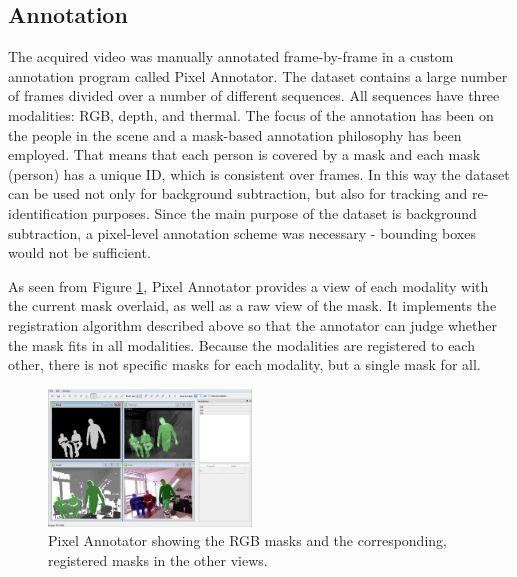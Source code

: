 \documentclass[10pt,twocolumn,letterpaper]{article}
\begin{document}
\subsection{Annotation}
%
The acquired video was manually annotated frame-by-frame in a custom annotation program called Pixel Annotator. The dataset contains a large number of frames divided over a number of different sequences. All sequences have three modalities: RGB, depth, and thermal. The focus of the annotation has been on the people in the scene and a mask-based annotation philosophy has been employed. That means that each person is covered by a mask and each mask (person) has a unique ID, which is consistent over frames. In this way the dataset can be used not only for background subtraction, but also for tracking and re-identification purposes. Since the main purpose of the dataset is background subtraction, a pixel-level annotation scheme was necessary - bounding boxes would not be sufficient.
 
As seen from Figure \ref{fig:pixelannotator}, Pixel Annotator provides a view of each modality with the current mask overlaid, as well as a raw view of the mask. It implements the registration algorithm described above so that the annotator can judge whether the mask fits in all modalities. Because the modalities are registered to each other, there is not specific masks for each modality, but a single mask for all.

\begin{figure}%
\includegraphics[width=0.48\textwidth]{pixelannotator2.png}%
\caption{Pixel Annotator showing the RGB masks and the corresponding, registered masks in the other views.}%
\label{fig:pixelannotator}%
\end{figure}
\end{document}
